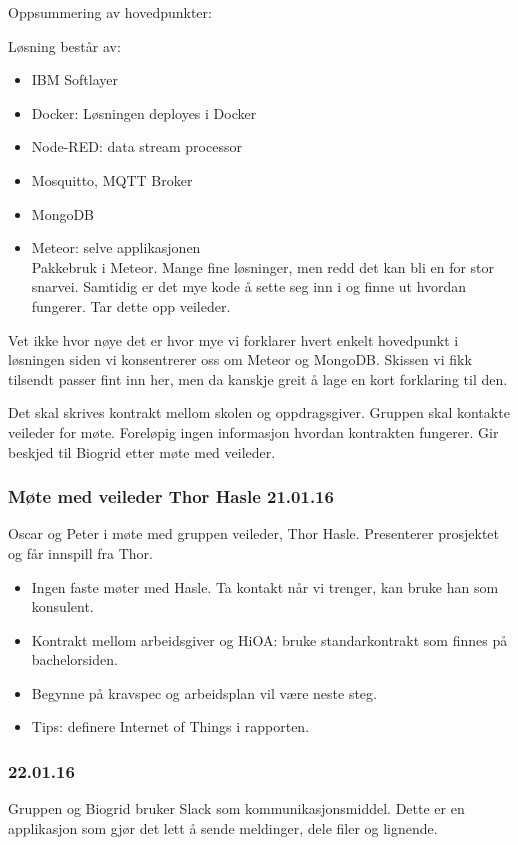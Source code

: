 \documentclass[12pt, oneside]{article}
\begin{document}
Oppsummering av hovedpunkter:

Løsning består av:
\begin{itemize}
	\item IBM Softlayer
	\item Docker: Løsningen deployes i Docker
	\item Node-RED: data stream processor
	\item Mosquitto, MQTT Broker
	\item MongoDB
	\item Meteor: selve applikasjonen\\
	Pakkebruk i Meteor. Mange fine løsninger, men redd det kan bli en for stor snarvei. Samtidig er det mye kode å sette seg inn i og finne ut hvordan 	fungerer. Tar dette opp veileder. 
\end{itemize}
Vet ikke hvor nøye det er hvor mye vi forklarer hvert enkelt hovedpunkt i løsningen siden vi konsentrerer oss om Meteor og MongoDB. Skissen vi fikk tilsendt passer fint inn her, men da kanskje greit å lage en kort forklaring til den.

Det skal skrives kontrakt mellom skolen og oppdragsgiver. Gruppen skal kontakte veileder for møte. Foreløpig ingen informasjon hvordan kontrakten fungerer. Gir beskjed til Biogrid etter møte med veileder. 


\subsubsection{Møte med veileder Thor Hasle 21.01.16}
Oscar og Peter i møte med gruppen veileder, Thor Hasle. Presenterer prosjektet og får innspill fra Thor.
\begin{itemize}
	\item  Ingen faste møter med Hasle. Ta kontakt når vi trenger, kan bruke han som konsulent.
	\item  Kontrakt mellom arbeidsgiver og HiOA: bruke standarkontrakt som finnes på bachelorsiden.
	\item  Begynne på kravspec og arbeidsplan vil være neste steg.
	\item  Tips: definere Internet of Things i rapporten.
\end{itemize}

\subsubsection{22.01.16}
Gruppen og Biogrid bruker Slack som kommunikasjonsmiddel. Dette er en applikasjon som gjør det lett å sende meldinger, dele filer og lignende.
\end{document}
